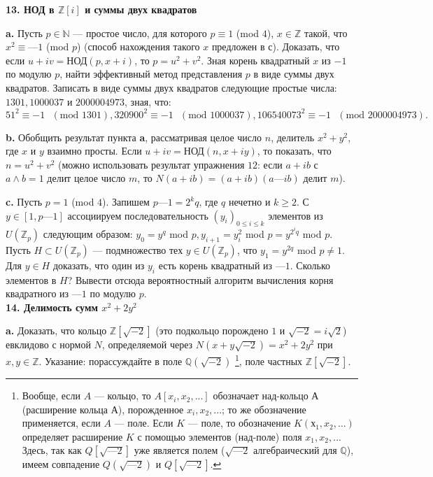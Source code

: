 \documentclass{mai_book}
\begin{document}
\noindent \textbf{13. НОД в $\mathbb{Z}[i]$ и суммы двух квадратов}

\textbf{a.} Пусть $p \in \mathbb{N}$ — простое число, для которого $p \equiv 1$ (mod $4$), $x \in \mathbb{Z}$ такой, что $x^2 \equiv —1$ (mod $p$) (способ нахождения такого $x$ предложен в с). Доказать, что если $u + iv = $НОД$(p, x + i)$, то $p = u^2 + v^2$. Зная корень квадратный $x$ из $-1$ по модулю $p$, найти эффективный метод представления $p$ в виде суммы двух квадратов. Записать в виде суммы двух квадратов следующие простые числа: $1301, 1000037$ и $2 000 004 973$, зная, что:
\[
51^2 \equiv -1 \text{ } (\text{mod } 1301), 320900^2 \equiv -1 \text{ } (\text{mod } 1000037), 106540073^2 \equiv -1 \text{ } (\text{mod } 2000004973).
\]

\textbf{b.} Обобщить результат пункта \textbf{a}, рассматривая целое число $n$, делитель $x^2 + y^2$, где $x$ и $y$ взаимно просты. Если $u+iv = $НОД$(n, x + iy)$, то показать, что $n=u^2+v^2$ (можно использовать результат 
упражнения $12$: если $a + ib$ с $a \wedge b = 1$ делит целое число $m$, то $N(a + ib) = (a + ib)(a — ib)$ делит $m$).

\textbf{c.} Пусть $p = 1$ (mod $4$). Запишем $p—1 = 2^kq$, где $q$ нечетно и $k \ge 2$. С $y \in [1,p—1]$ ассоциируем последовательность $(y_i)_{0\le i\le k}$ элементов из $U(\mathbb{Z}_p)$ следующим образом: $y_0 = y^q$ mod $p, y_{i+1} = y^2_i$ mod $p = y^{2^iq}$ mod $p$. Пусть $H \subset U(\mathbb{Z}_p)$ — подмножество тех $y \in U(\mathbb{Z}_p)$, что $y_1 = y^{2q}$ mod $p \ne
1$. Для $y \in H$ доказать, что один из $y_i$ есть корень квадратный из $—1$.
Сколько элементов в $H$? Вывести отсюда вероятностный алгоритм 
вычисления корня квадратного из $—1$ по модулю $p$.
\\

\noindent \textbf{14. Делимость сумм $x^2+2 y^2$}

\textbf{a.} Доказать, что кольцо $\mathbb{Z}[\sqrt{-2}]$ (это подкольцо порождено $1$ и $\sqrt{-2}=i\sqrt{2}$) евклидово с нормой $N$, определяемой через $N(x+y\sqrt{-2}) = x^2+2y^2$ при $x,y \in \mathbb{Z}$. Указание: порассуждайте в поле $\mathbb{Q}(\sqrt{-2})$ \footnote{Вообще, если $A$ — кольцо, то $A[x_i,x_2,...]$ обозначает над-кольцо $А$ (расширение
кольца $А$), порожденное $x_i,x_2,...$; то же обозначение применяется, если $A$ — поле. Если $K$ — поле, то обозначение $K(х_1,x_2,...)$ определяет расширение $K$ с помощью элементов (над-поле) поля $x_1,x_2,...$ Здесь, так как $Q[\sqrt{—2}]$ уже является полем ($\sqrt{—2}$ алгебраический для $\mathbb{Q}$), имеем совпадение $Q(\sqrt{—2})$ и $Q[\sqrt{— 2}]$.}, поле частных $\mathbb{Z}[\sqrt{-2}]$.
\end{document}
